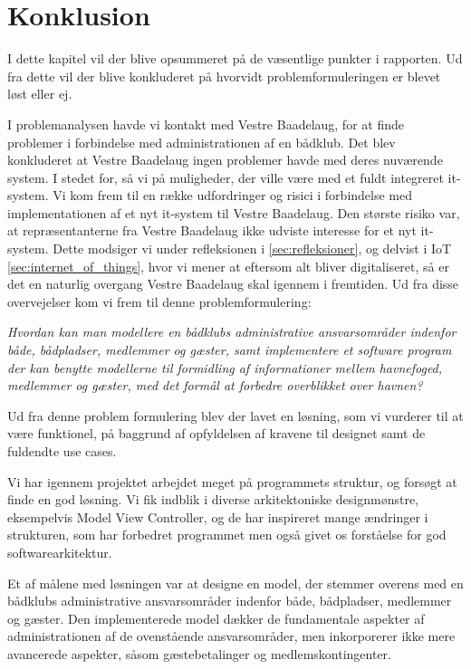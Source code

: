 \chapter{Konklusion}
\label{cha:konklusion}
I dette kapitel vil der blive opsummeret på de væsentlige punkter i rapporten. Ud fra dette vil der blive konkluderet på hvorvidt problemformuleringen er blevet løst eller ej.

I problemanalysen havde vi kontakt med Vestre Baadelaug, for at finde problemer i forbindelse med administrationen af en bådklub. Det blev konkluderet at Vestre Baadelaug ingen problemer havde med deres nuværende system. I stedet for, så vi på muligheder, der ville være med et fuldt integreret it-system. Vi kom frem til en række udfordringer og risici i forbindelse med implementationen af et nyt it-system til Vestre Baadelaug. Den største risiko var, at repræsentanterne fra Vestre Baadelaug ikke udviste interesse for et nyt it-system. Dette modsiger vi under refleksionen i \cref{sec:refleksioner}, og delvist i IoT \cref{sec:internet_of_things}, hvor vi mener at eftersom alt bliver digitaliseret, så er det en naturlig overgang Vestre Baadelaug skal igennem i fremtiden. Ud fra disse overvejelser kom vi frem til denne problemformulering:

\begin{displayquote}
\textit{Hvordan kan man modellere en bådklubs administrative ansvarsområder indenfor både, bådpladser, medlemmer og gæster, samt implementere et software program der kan benytte modellerne til formidling af informationer mellem havnefoged, medlemmer og gæster, med det formål at forbedre overblikket over havnen?}
\end{displayquote}

Ud fra denne problem formulering blev der lavet en løsning, som vi vurderer til at være funktionel, på baggrund af opfyldelsen af kravene til designet samt de fuldendte use cases.

Vi har igennem projektet arbejdet meget på programmets struktur, og forsøgt at finde en god løsning. Vi fik indblik i diverse arkitektoniske designmønstre, eksempelvis Model View Controller, og de har inspireret mange ændringer i strukturen, som har forbedret programmet men også givet os forståelse for god softwarearkitektur.

Et af målene med løsningen var at designe en model, der stemmer overens med en bådklubs administrative ansvarsområder indenfor både, bådpladser, medlemmer og gæster. Den implementerede model dækker de fundamentale aspekter af administrationen af de ovenstående ansvarsområder, men inkorporerer ikke mere avancerede aspekter, såsom gæstebetalinger og medlemskontingenter.

